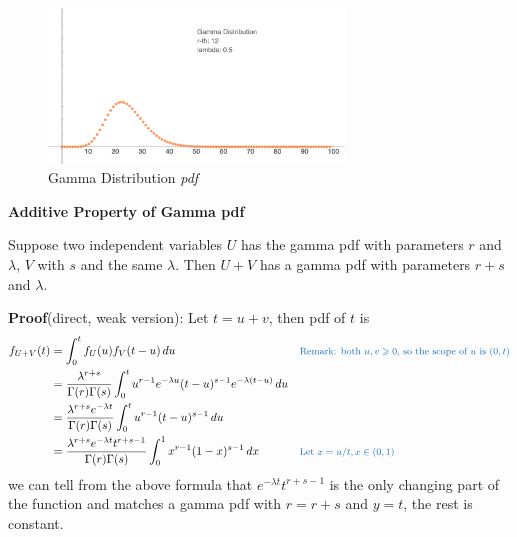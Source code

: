 \documentclass[11pt]{article}
\begin{document}
\begin{figure}[H] %
\centering
\includegraphics[width=0.7\textwidth]{gamma}
\caption{Gamma Distribution \textit{pdf} }
\label{fig:f1}
\end{figure}


\begin{tcolorbox}[
	enhanced, 
	width=\textwidth, 
	fontupper=\normalsize,%
	drop fuzzy shadow southwest,
	boxrule=0.4pt,
	sharp corners,
	colframe=yellow!80!black,
	colback=yellow!10]
	
\textbf{\color{RoyalBlue} Additive Property of Gamma pdf}  

\qquad Suppose two independent variables $U$ has the gamma pdf with parameters $r$ and $\lambda$,  $V$ with $s$ and the same $\lambda$.  Then $U+V$ has a gamma pdf with parameters $r+s$ and $\lambda$. 

\end{tcolorbox}



\textbf{Proof}(direct, weak version):  Let $t= u + v$,  then pdf of $t$ is
\[
\begin{aligned}
f_{U+V} (t) 
	&= \int _0 ^t f_U(u) f_V(t-u) \, du && \color{RoyalBlue}  \text{\footnotesize Remark: both $u,v \geqslant 0 $,  so the scope of $u$ is $(0, t)$} \\ 
	&= \frac{\lambda^{r+s} } {\Gamma(r) \Gamma(s)} \int _0 ^t u^{r-1} e^{-\lambda u} (t-u)^{s-1} e^{-\lambda (t-u)} \, du \\
	&=  \frac{\lambda^{r+s} e^{-\lambda t} } {\Gamma(r) \Gamma(s)} \int _0 ^t u^{r-1} (t-u)^{s-1}  \, du \\
	&=  \frac{\lambda^{r+s} e^{-\lambda t} t^{r+s-1} } {\Gamma(r) \Gamma(s)} \int _0 ^1 x^{r-1} (1-x)^{s-1}  \, dx && \color{RoyalBlue}  \text{\footnotesize Let $x=u/t,  x \in (0, 1)$ } \\
\end{aligned}
\]
we can tell from the above formula that $\displaystyle e^{-\lambda t} t^{r+s-1} $ is the only changing part of the function and matches a gamma pdf with $r=r+s$ and $y=t$,  the rest is constant.  
\end{document}
